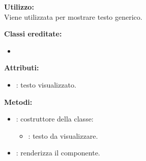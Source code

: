 \textbf{Utilizzo:}\\
Viene utilizzata per mostrare testo generico.

\textbf{Classi ereditate:}
\begin{itemize}
	\item {}
\end{itemize}


\textbf{Attributi:}
\begin{itemize}
	\item {}: testo visualizzato.
\end{itemize}

\textbf{Metodi:}
\begin{itemize}
	\item {}: costruttore della classe:
	\begin{itemize}
		\item {}: testo da visualizzare.
	\end{itemize}
	\item {}: renderizza il componente.
\end{itemize}
